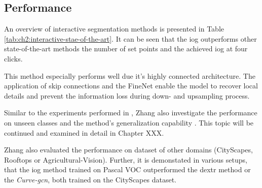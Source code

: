 \subsection{Performance}\label{ord:ch3:sec4:subsec5}

An overview of interactive segmentation methods is presented in Table \ref{tab:ch2:interactive-stae-of-the-art}.
It can be seen that the \gls{iog} outperforms other state-of-the-art methods the number of set points and the achieved \gls{iog} at four clicks.

This method especially performs well due it's highly connected architecture.
The application of skip connections and the FineNet enable the model to recover local details and prevent the information loss during down- and upsampling process.

Similar to the experiments performed in \cite{Man18-DEXTR}, Zhang \etal also investigate the performance on unseen classes and the method's generalization capability \Cite{Zha20-IOG}. 
This topic will be continued and examined in detail in Chapter XXX.

Zhang \etal also evaluated the performance on dataset of other domains (\eg CityScapes, Rooftops or Agricultural-Vision).
Further, it is demonstated in various setups, that the \gls{iog} method trained on Pascal VOC outperformed the \gls{dextr} method or the \textit{Curve-\gls{gcn}}, both trained on the CityScapes dataset.
